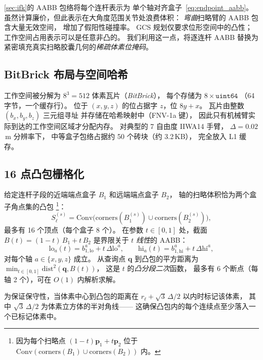 \documentclass[journal]{IEEEtran}
\begin{document}
\cref{sec:ifk}的 AABB 包络将每个连杆表示为
单个轴对齐盒子~\eqref{eq:endpoint_aabb}。
虽然计算廉价，但此表示在大角度范围关节处浪费体积：
\emph{弯曲}扫略臂的 AABB 包含大量无效空间，
增加了假阳性碰撞率。
GCS 规划仅要求位形空间中的凸性；
工作空间占用表示可以是任意非凸的。
我们利用这一点，将逐连杆 AABB 替换为
紧密填充真实扫略胶囊几何的\emph{稀疏体素位掩码}。

\subsection{BitBrick 布局与空间哈希}\label{sec:bitbrick}

工作空间被分解为 $8^3{=}512$ 体素瓦片（\emph{BitBrick}），
每个存储为 $8{\times}\mathtt{uint64}$
（64 字节，一个缓存行）。
位于 $(x,y,z)$ 的位占据字 $z$，位 $8y{+}x$。
瓦片由整数 $(b_x,b_y,b_z)$ 三元组寻址
并存储在哈希映射中（FNV-1a 键），
因此只有机械臂实际到达的工作空间区域才分配内存。
对典型的 7 自由度 IIWA14 手臂，
$\Delta{=}0.02$\,m 分辨率下，
中等盒子包络占据约 50 个砖块（约 3.2\,KB），
完全放入 L1 缓存。

\subsection{16 点凸包栅格化}\label{sec:hull16}

给定连杆子段的近端端点盒子 $B_1$ 和远端端点盒子 $B_2$，
轴的扫略体积恰为两个盒子角点集的凸包%
\footnote{因为每个扫略点 $(1{-}t)\bm{p}_1+t\bm{p}_2$
位于 $\mathrm{Conv}(\mathrm{corners}(B_1)\cup\mathrm{corners}(B_2))$ 内。}：
\begin{equation}\label{eq:hull16}
  S_\ell^{(s)} = \mathrm{Conv}\bigl(
    \mathrm{corners}(B_1^{(s)}) \cup \mathrm{corners}(B_2^{(s)})
  \bigr),
\end{equation}
最多有 16 个顶点（每个盒子 8 个）。
在参数 $t \in [0,1]$ 处，截面
$B(t) = (1{-}t)\,B_1 + t\,B_2$ 是界限关于 $t$ \emph{线性}的 AABB：
\begin{equation}\label{eq:bt_linear}
  \mathrm{lo}_a(t) = b_{1,\mathrm{lo}}^a + t\,\Delta\mathrm{lo}^a, \qquad
  \mathrm{hi}_a(t) = b_{1,\mathrm{hi}}^a + t\,\Delta\mathrm{hi}^a,
\end{equation}
对每个轴 $a \in \{x,y,z\}$ 成立。
从查询点 $\bm{q}$ 到凸包的平方距离为
$\min_{t \in [0,1]} \mathrm{dist}^2(\bm{q}, B(t))$，
这是 $t$ 的\emph{凸分段二次}函数，
最多有 6 个断点（每轴 2 个），可在 $O(1)$ 内解析求解。

为保证保守性，当体素中心到凸包的距离在
$r_\ell + \sqrt{3}\,\Delta/2$ 以内时标记该体素，
其中 $\sqrt{3}\,\Delta/2$ 为体素立方体的半对角线——
这确保凸包内的每个连续点至少落入一个已标记体素中。
\end{document}
